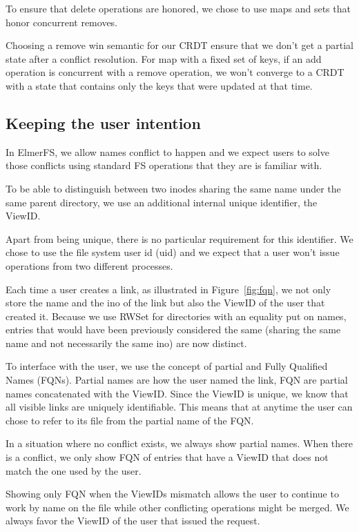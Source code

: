 \documentclass[sigconf, anonymous, 10pt]{acmart}
\begin{document}
\label{sec:deletion}
To ensure that delete operations are honored, we chose to use maps and
sets that honor concurrent removes.

Choosing a remove win semantic for our CRDT ensure that we don't get a partial
state after a conflict resolution. For map with a fixed set of keys,
if an add operation is concurrent with a remove operation,
we won't converge to a CRDT with a state that contains only
the keys that were updated at that time.

\subsection{Keeping the user intention}

In ElmerFS, we allow names conflict to happen and we expect users to solve
those conflicts using standard FS operations that they are is familiar with.

To be able to distinguish between two inodes sharing the same name under
the same parent directory, we use an additional internal unique identifier,
the ViewID.

Apart from being unique, there is no particular requirement for this identifier.
We chose to use the file system user id (uid) and we expect that a
user won’t issue operations from two different processes.

Each time a user creates a link, as illustrated in Figure~\ref{fig:fqn},
we not only store the name and the ino of the link but also the ViewID of the user that created it.
Because we use RWSet for directories with an equality put on names,
entries that would have been previously considered the same
(sharing the same name and not necessarily the same ino) are now distinct.

To interface with the user, we use the concept of partial and
Fully Qualified Names (FQNs).
Partial names are how the user named the link,
FQN are partial names concatenated with the ViewID.
Since the ViewID is unique, we know that all visible links are uniquely
identifiable. This means that at anytime the user can chose to refer to its file
from the partial name of the FQN.

In a situation where no conflict exists, we always show partial names.
When there is a conflict, we only show FQN of entries that have a ViewID that
does not match the one used by the user.

Showing only FQN when the ViewIDs mismatch allows the user to continue to
work by name on the file while other conflicting operations might be merged.
We always favor the ViewID of the user that issued the request.
\end{document}
